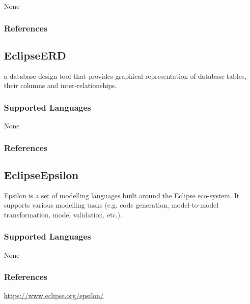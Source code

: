 None


\subsubsection{References}





\subsection{EclipseERD}
\label{subsecT:EclipseERD}


a database design tool that provides graphical representation of database tables, their columns and inter-relationships.

\subsubsection{Supported Languages}

None


\subsubsection{References}





\subsection{EclipseEpsilon}
\label{subsecT:EclipseEpsilon}


Epsilon is a set of modelling languages built around the Eclipse eco-system.
It supports various modelling tasks (e.g. code generation, model-to-model transformation, model validation, etc.).

\subsubsection{Supported Languages}

None


\subsubsection{References}

\url{https://www.eclipse.org/epsilon/}




